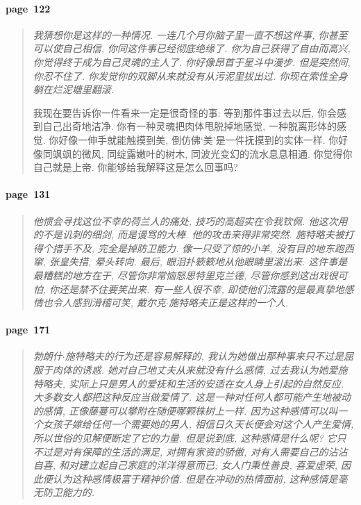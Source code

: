\paragraph*{page~122}
\begin{quotation}
    \itshape
    我猜想你是这样的一种情况. 一连几个月你脑子里一直不想这件事, 你甚至可以使自己相信, 你同这件事已经彻底绝缘了. 你为自己获得了自由而高兴, 你觉得终于成为自己灵魂的主人了. 你好像昂首于星斗中漫步. 但是突然间, 你忍不住了. 你发觉你的双脚从来就没有从污泥里拔出过. 你现在索性全身躺在烂泥塘里翻滚. 

    我现在要告诉你一件看来一定是很奇怪的事: 等到那件事过去以后, 你会感到自己出奇地洁净. 你有一种灵魂把肉体甩脱掉地感觉, 一种脱离形体的感觉. 你好像一伸手就能触摸到美, 倒仿佛`美'是一件抚摸到的实体一样. 你好像同飒飒的微风, 同绽露嫩叶的树木, 同波光变幻的流水息息相通. 你觉得你自己就是上帝. 你能够给我解释这是怎么回事吗?
\end{quotation}

\paragraph*{page~131}
\begin{quotation}
    \itshape
    他惯会寻找这位不幸的荷兰人的痛处, 技巧的高超实在令我钦佩. 他这次用的不是讥刺的细剑, 而是谩骂的大棒. 他的攻击来得非常突然. 施特略夫被打得个措手不及, 完全是掉防卫能力. 像一只受了惊的小羊, 没有目的地东跑西窜, 张皇失措, 晕头转向. 最后, 眼泪扑簌簌地从他眼睛里滚出来. 这件事是最糟糕的地方在于, 尽管你非常恼怒思特里克兰德, 尽管你感到这出戏很可怕, 你还是禁不住要笑出来. 有一些人很不幸, 即使他们流露的是最真挚地感情也令人感到滑稽可笑, 戴尔克$\cdot$施特略夫正是这样的一个人. 
\end{quotation}

\paragraph*{page~171}
\begin{quotation}
    \itshape
    勃朗什$\cdot$施特略夫的行为还是容易解释的, 我认为她做出那种事来只不过是屈服于肉体的诱惑. 她对自己地丈夫从来就没有什么感情, 过去我认为她爱施特略夫, 实际上只是男人的爱抚和生活的安适在女人身上引起的自然反应. 大多数女人都把这种反应当做爱情了. 这是一种对任何人都可能产生地被动的感情, 正像藤蔓可以攀附在随便哪颗株树上一样. 因为这种感情可以叫一个女孩子嫁给任何一个需要她的男人, 相信日久天长便会对这个人产生爱情, 所以世俗的见解便断定了它的力量. 但是说到底, 这种感情是什么呢? 它只不过是对有保障的生活的满足, 对拥有家资的骄傲, 对有人需要自己的沾沾自喜, 和对建立起自己家庭的洋洋得意而已; 女人门秉性善良, 喜爱虚荣, 因此便认为这种感情极富于精神价值. 但是在冲动的热情面前, 这种感情是毫无防卫能力的. 
\end{quotation}

